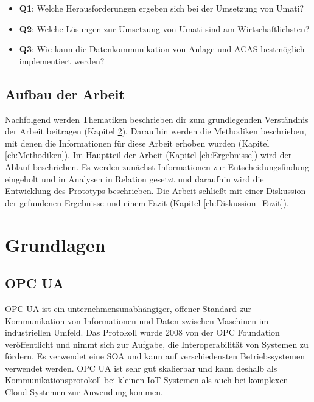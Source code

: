 \documentclass[a4paper, 12pt, oneside]{scrbook}
\begin{document}
	\begin{itemize}
		\item \textbf{Q1}: Welche Herausforderungen ergeben sich bei der Umsetzung von Umati?
		\item \textbf{Q2}: Welche Lösungen zur Umsetzung von Umati sind am Wirtschaftlichsten?
		\item \textbf{Q3}: Wie kann die Datenkommunikation von Anlage und ACAS bestmöglich implementiert werden?
	\end{itemize}
	
	\section{Aufbau der Arbeit}
	
	Nachfolgend werden Thematiken beschrieben dir zum grundlegenden Verständnis der Arbeit beitragen (Kapitel \ref{ch:Grundlagen}). Daraufhin werden die Methodiken beschrieben, mit denen die Informationen für diese Arbeit erhoben wurden (Kapitel \ref{ch:Methodiken}). Im Hauptteil der Arbeit (Kapitel \ref{ch:Ergebnisse}) wird der Ablauf beschrieben. Es werden zunächst Informationen zur Entscheidungsfindung eingeholt und in Analysen in Relation gesetzt und daraufhin wird die Entwicklung des Prototyps beschrieben. Die Arbeit schließt mit einer Diskussion der gefundenen Ergebnisse und einem Fazit (Kapitel \ref{ch:Diskussion_Fazit}).
	
\chapter{Grundlagen}\label{ch:Grundlagen}
	
	
	
	\section{OPC UA}
	
	
	
	 \ac{OPC UA} ist ein unternehmensunabhängiger, offener Standard zur Kommunikation von Informationen und Daten zwischen Maschinen im industriellen Umfeld. Das Protokoll wurde 2008 von der OPC Foundation veröffentlicht und nimmt sich zur Aufgabe, die Interoperabilität von Systemen zu fördern. Es verwendet eine \ac{SOA} und kann auf verschiedensten Betriebssystemen verwendet werden. OPC UA ist sehr gut skalierbar und kann deshalb als Kommunikationsprotokoll bei kleinen \ac{IoT} Systemen als auch bei komplexen Cloud-Systemen zur Anwendung kommen. 
	 
\end{document}

